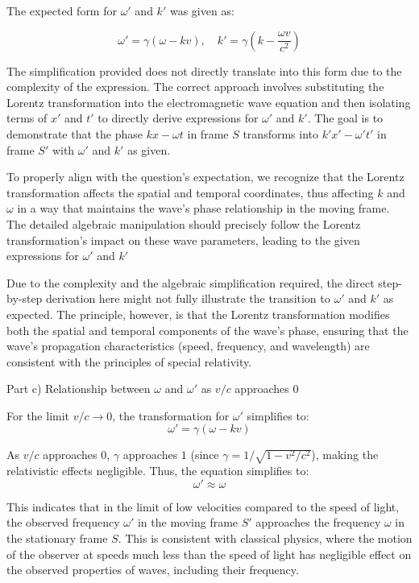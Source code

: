 \documentclass[a4paper,11pt]{article}
\begin{document}
The expected form for \(\omega'\) and \(k'\) was given as:

\[
\omega' = \gamma(\omega-kv), \quad k' = \gamma(k - \frac{\omega v}{c^2})
\]

The simplification provided does not directly translate into this form due to the complexity of the expression. The correct approach involves substituting the Lorentz transformation into the electromagnetic wave equation and then isolating terms of \(x'\) and \(t'\) to directly derive expressions for \(\omega'\) and \(k'\). The goal is to demonstrate that the phase \(kx-\omega t\) in frame \(S\) transforms into \(k'x'-\omega' t'\) in frame \(S'\) with \(\omega'\) and \(k'\) as given.

To properly align with the question's expectation, we recognize that the Lorentz transformation affects the spatial and temporal coordinates, thus affecting \(k\) and \(\omega\) in a way that maintains the wave's phase relationship in the moving frame. The detailed algebraic manipulation should precisely follow the Lorentz transformation's impact on these wave parameters, leading to the given expressions for \(\omega'\) and \(k'\)

Due to the complexity and the algebraic simplification required, the direct step-by-step derivation here might not fully illustrate the transition to \(\omega'\) and \(k'\) as expected. The principle, however, is that the Lorentz transformation modifies both the spatial and temporal components of the wave's phase, ensuring that the wave's propagation characteristics (speed, frequency, and wavelength) are consistent with the principles of special relativity.

Part c) Relationship between \( \omega \) and \( \omega' \) as \( v/c \) approaches \( 0 \)

For the limit \( v/c \rightarrow 0 \), the transformation for \( \omega' \) simplifies to:
\[ \omega' = \gamma(\omega - kv) \]

As \( v/c \) approaches \( 0 \), \( \gamma \) approaches \( 1 \) (since \( \gamma = 1/\sqrt{1 - v^2/c^2} \)), making the relativistic effects negligible. Thus, the equation simplifies to:
\[ \omega' \approx \omega \]

This indicates that in the limit of low velocities compared to the speed of light, the observed frequency \( \omega' \) in the moving frame \( S' \) approaches the frequency \( \omega \) in the stationary frame \( S \). This is consistent with classical physics, where the motion of the observer at speeds much less than the speed of light has negligible effect on the observed properties of waves, including their frequency.
\end{document}

